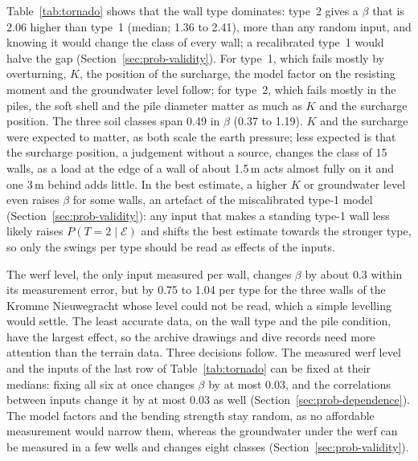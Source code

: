 Table~\ref{tab:tornado} shows that the wall type dominates: type~2 gives a
$\beta$ that is 2.06 higher than type~1 (median; 1.36 to 2.41), more than any
random input, and knowing it would change the class of every wall; a
recalibrated type~1 would halve the gap (Section~\ref{sec:prob-validity}). For
type~1, which fails mostly by overturning, $K$, the position of the surcharge,
the model factor on the resisting moment and the groundwater level follow; for
type~2, which fails mostly in the piles, the soft shell and the pile diameter
matter as much as $K$ and the surcharge position. The three soil classes span
0.49 in $\beta$ (0.37 to 1.19). $K$ and the surcharge were expected to matter,
as both scale the earth pressure; less expected is that the surcharge
position, a judgement without a source, changes the class of 15 walls, as a
load at the edge of a wall of about 1.5\,m acts almost fully on it and one
3\,m behind adds little. In the best estimate, a higher $K$ or groundwater level
even raises $\beta$ for some walls, an artefact of the miscalibrated type-1
model (Section~\ref{sec:prob-validity}): any input that makes a standing type-1
wall less likely raises $P(T{=}2 \mid \mathcal{E})$ and shifts the best
estimate towards the stronger type, so only the swings per type should be read
as effects of the inputs.

The werf level, the only input measured per wall, changes $\beta$ by about 0.3
within its measurement error, but by 0.75 to 1.04 per type for the three walls
of the Kromme Nieuwegracht whose level could not be read, which a simple
levelling would settle. The least accurate data, on the wall type and the pile condition, have
the largest effect, so the archive drawings and dive records need more
attention than the terrain data. Three decisions follow. The measured werf
level and the inputs of the last row of Table~\ref{tab:tornado} can be fixed
at their medians: fixing all six at once changes $\beta$ by at most 0.03, and
the correlations between inputs change it by at most 0.03 as well
(Section~\ref{sec:prob-dependence}).
The model factors and the bending strength stay random, as no affordable
measurement would narrow them, whereas the groundwater under the werf can be
measured in a few wells and changes eight classes
(Section~\ref{sec:prob-validity}).

